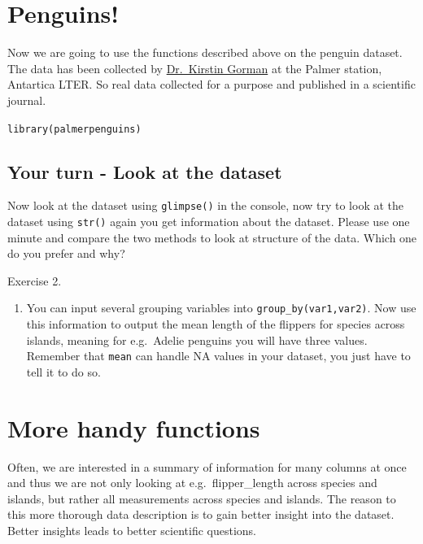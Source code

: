 \documentclass[
]{book}
\providecommand{\tightlist}{%
  \setlength{\itemsep}{0pt}\setlength{\parskip}{0pt}}
\begin{document}
\hypertarget{penguins}{%
\section{Penguins!}\label{penguins}}

Now we are going to use the functions described above on the penguin
dataset. The data has been collected by
\href{https://gormankb.github.io/}{Dr.~Kirstin Gorman} at the Palmer
station, Antartica LTER. So real data collected for a purpose and
published in a scientific journal.

\texttt{library(palmerpenguins)}

\hypertarget{your-turn---look-at-the-dataset}{%
\subsection{Your turn - Look at the
dataset}\label{your-turn---look-at-the-dataset}}

Now look at the dataset using \texttt{glimpse()} in the console, now try
to look at the dataset using \texttt{str()} again you get information
about the dataset. Please use one minute and compare the two methods to
look at structure of the data. Which one do you prefer and why?

Exercise 2.

\begin{enumerate}
\def\labelenumi{\arabic{enumi}.}
\tightlist
\item
  You can input several grouping variables into
  \texttt{group\_by(var1,var2)}. Now use this information to output the
  mean length of the flippers for species across islands, meaning for
  e.g.~Adelie penguins you will have three values. Remember that
  \texttt{mean} can handle NA values in your dataset, you just have to
  tell it to do so.
\end{enumerate}

\hypertarget{more-handy-functions}{%
\section{More handy functions}\label{more-handy-functions}}

Often, we are interested in a summary of information for many columns at
once and thus we are not only looking at e.g.~flipper\_length across
species and islands, but rather all measurements across species and
islands. The reason to this more thorough data description is to gain
better insight into the dataset. Better insights leads to better
scientific questions.
\end{document}
